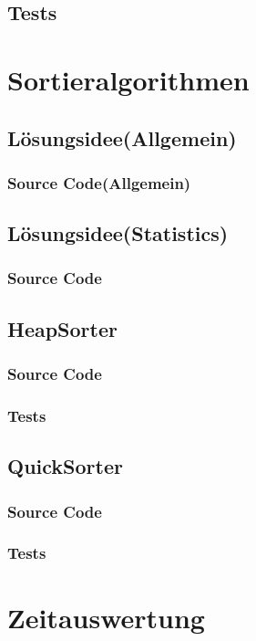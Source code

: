 \documentclass[11pt, a4paper, twoside]{article}   	%
\newcommand{\ideaSection}{Lösungsidee}
\newcommand{\testSection}{Tests}
\begin{document}
\subsection{\testSection}
\newpage
{\color{myred}
	\section
		{Sortieralgorithmen}
}
\subsection{\ideaSection \hspace{2mm}(Allgemein)}
\newpage
\subsubsection{Source Code\hspace{2mm}(Allgemein)}

\newpage
\subsection{\ideaSection \hspace{2mm}(Statistics)}

\newpage
\subsubsection{Source Code}

\newpage
\subsection{HeapSorter}
\newpage
\subsubsection{Source Code}
\newpage
\subsubsection{\testSection}
\newpage
\subsection{QuickSorter}

\newpage
\subsubsection{Source Code}

\newpage
\subsubsection{\testSection}
\newpage
{\color{myred}
	\section
		{Zeitauswertung}
}
\end{document}
